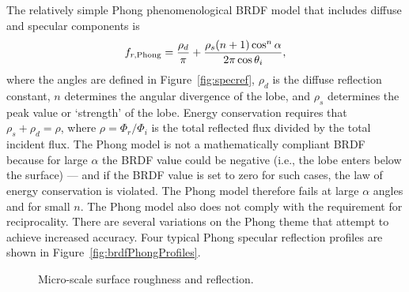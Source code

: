 The relatively simple Phong phenomenological BRDF model that includes diffuse and specular components is \cite{Willers2013}
\begin{equation}
f_{r,{\rm Phong}} = \frac{\rho_d}{\pi} + \frac{\rho_s(n+1)\cos^n\alpha}{2\pi\cos\theta_i},
\label{eq:BRDFequationPhong}
\end{equation}
where the angles are defined in Figure~\ref{fig:specref},
$\rho_d$ is the diffuse reflection constant,
$n$ determines the angular divergence of the lobe, and $\rho_s$ determines the peak value or `strength' of the lobe. Energy conservation requires that $\rho_s + \rho_d = \rho$, where $\rho=\Phi_r/\Phi_i$ is the total reflected flux divided by the total incident flux. The Phong model is not a  mathematically compliant BRDF because for large $\alpha$ the BRDF value could be negative (i.e., the lobe enters below the surface) --- and if the BRDF value is set to zero for such cases, the law of energy conservation is violated.  The Phong model therefore fails at large $\alpha$ angles and for small $n$. The Phong model also does not comply with the requirement for reciprocality.  There are several variations on the Phong theme that attempt to achieve increased accuracy.  Four typical Phong specular reflection profiles are shown in Figure~\ref{fig:brdfPhongProfiles}.

\begin{figure}[t]
\centering
{}
\caption{Micro-scale surface roughness and reflection.\label{nonlambert}}
\end{figure}


